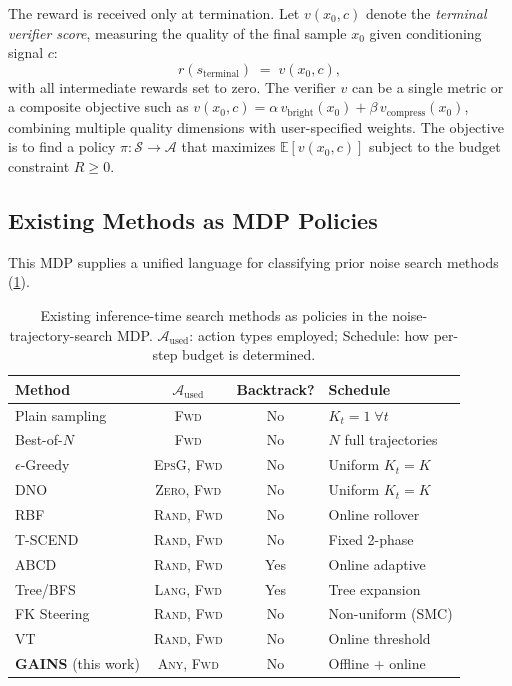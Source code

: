 The reward is received only at termination.
Let $v(x_0, c)$ denote the \emph{terminal verifier score}, measuring
the quality of the final sample $x_0$ given conditioning signal $c$:
\[
  r(s_{\text{terminal}}) \;=\; v(x_0, c),
\]
with all intermediate rewards set to zero.
The verifier $v$ can be a single metric or a composite objective
such as $v(x_0, c) = \alpha\, v_{\text{bright}}(x_0)
+ \beta\, v_{\text{compress}}(x_0)$,
combining multiple quality dimensions with user-specified weights.
The objective is to find a policy
$\pi : \mathcal{S} \to \mathcal{A}$ that maximizes
$\mathbb{E}[v(x_0, c)]$ subject to the budget constraint $R \ge 0$.

\subsection{Existing Methods as MDP Policies}
\label{sec:mdp-policies}

This MDP supplies a unified language for classifying prior
noise search methods (\cref{tab:mdp_policies}).

\begin{table}[t]
\centering
\caption{Existing inference-time search methods as policies in the
noise-trajectory-search MDP.
$\mathcal{A}_{\text{used}}$: action types employed;
Schedule: how per-step budget is determined.}
\label{tab:mdp_policies}
\small
\begin{tabular}{lccl}
\toprule
\textbf{Method} & $\mathcal{A}_{\text{used}}$ &
\textbf{Backtrack?} & \textbf{Schedule} \\
\midrule
Plain sampling
  & \textsc{Fwd} & No & $K_t = 1\;\forall t$ \\
Best-of-$N$~\citep{ma2024inference}
  & \textsc{Fwd} & No & $N$ full trajectories \\
$\epsilon$-Greedy~\citep{ramesh2025nts}
  & \textsc{EpsG}, \textsc{Fwd} & No & Uniform $K_t = K$ \\
DNO~\citep{tang2024dno}
  & \textsc{Zero}, \textsc{Fwd} & No & Uniform $K_t = K$ \\
RBF~\citep{kim2025rbf}
  & \textsc{Rand}, \textsc{Fwd} & No & Online rollover \\
T-SCEND~\citep{zhang2025tscend}
  & \textsc{Rand}, \textsc{Fwd} & No & Fixed 2-phase \\
ABCD~\citep{lee2025abcd}
  & \textsc{Rand}, \textsc{Fwd} & Yes & Online adaptive \\
Tree/BFS~\citep{zhang2025classical}
  & \textsc{Lang}, \textsc{Fwd} & Yes & Tree expansion \\
FK Steering~\citep{singhal2025fk}
  & \textsc{Rand}, \textsc{Fwd} & No & Non-uniform (SMC) \\
VT~\citep{sundaresha2025vt}
  & \textsc{Rand}, \textsc{Fwd} & No & Online threshold \\
\midrule
\textbf{GAINS} (this work)
  & \textsc{Any}, \textsc{Fwd} & No &
  Offline + online \\
\bottomrule
\end{tabular}
\end{table}

